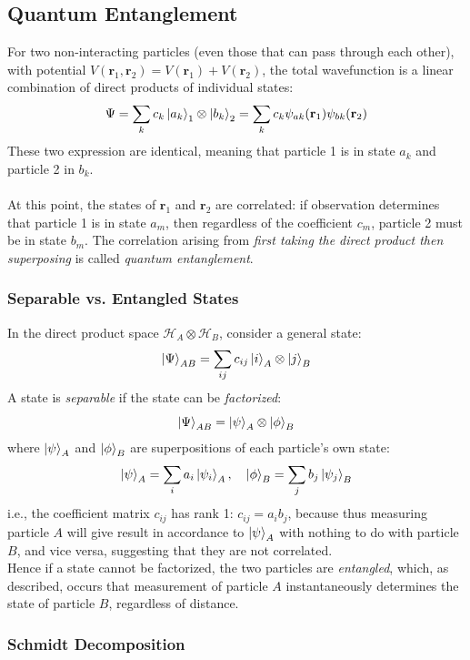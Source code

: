 \subsection{Quantum Entanglement}\label{entangle}

For two non-interacting particles (even those that can pass through each other), with potential $V(\mathbf{r}_1, \mathbf{r}_2) = V(\mathbf{r}_1) + V(\mathbf{r}_2)$, the total wavefunction is a linear combination of direct products of individual states:
\[
\Psi = \sum_{k}c_{k}\ket{a_k}_1\otimes\ket{b_k}_2
=\sum_{k} c_{k} \psi_{ak}(\mathbf{r}_1)\psi_{bk}(\mathbf{r}_2)
\]
These two expression are identical, meaning that particle 1 is in state $a_k$ and particle 2 in $b_k$.\\ \\
At this point, the states of $\mathbf{r}_1$ and $\mathbf{r}_2$ are correlated: if observation determines that particle 1 is in state $a_m$, then regardless of the coefficient $c_m$, particle 2 must be in state $b_m$.
The correlation arising from \textit{first taking the direct product then superposing} is called \emph{quantum entanglement}.

\subsubsection{Separable vs. Entangled States}

In the direct product space $\mathcal{H}_A \otimes \mathcal{H}_B$, consider a general state:
\[
    \ket{\Psi}_{AB} = \sum_{ij} c_{ij} \ket{i}_A \otimes \ket{j}_B
\]
A state is \emph{separable} if the state can be \emph{factorized}:
\[
    \ket{\Psi}_{AB} = \ket{\psi}_A \otimes \ket{\phi}_B
\]
where $\ket{\psi}_A$ and $\ket{\phi}_B$ are superpositions of each particle's own state:
\[
\ket{\psi}_A = \sum_{i}a_i\ket{\psi_i}_A, \quad 
\ket{\phi}_B = \sum_{j}b_j\ket{\psi_j}_B
\]
i.e., the coefficient matrix $c_{ij}$ has rank 1: $c_{ij} = a_i b_j$, because thus measuring particle $A$ will give result in accordance to $\ket{\psi}_A$ with nothing to do with particle $B$, and vice versa, suggesting that they are not correlated.\\
Hence if a state cannot be factorized, the two particles are \emph{entangled}, which, as described, occurs that measurement of particle $A$ instantaneously determines the state of particle $B$, regardless of distance.

\subsubsection{Schmidt Decomposition}


